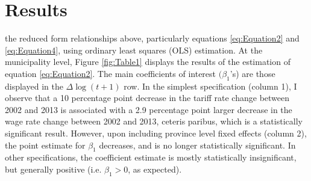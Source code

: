 \chapter{Results}
\label{sec:Results}

 the reduced form relationships above, particularly equations \ref{eq:Equation2}
and \ref{eq:Equation4}, using ordinary least squares (OLS) estimation.  At the municipality
level, Figure \ref{fig:Table1} displays the results of the estimation of equation \ref{eq:Equation2}. 
The main coefficients of interest $(\beta_1$'s) are those displayed in the $\Delta\log(t+1)$ row. In the simplest
specification (column 1), I observe that a 10 percentage point decrease in the tariff rate change between
2002 and 2013 is associated with a 2.9 percentage point larger decrease in the wage rate change between 
2002 and 2013, ceteris paribus, which is a statistically significant result. However, upon including 
province level fixed effects (column 2), the point estimate for $\beta_1$ decreases, and is no longer 
statistically significant. In other specifications, the coefficient estimate is mostly statistically 
insignificant, but generally positive (i.e. $\beta_1 > 0$, as expected).

